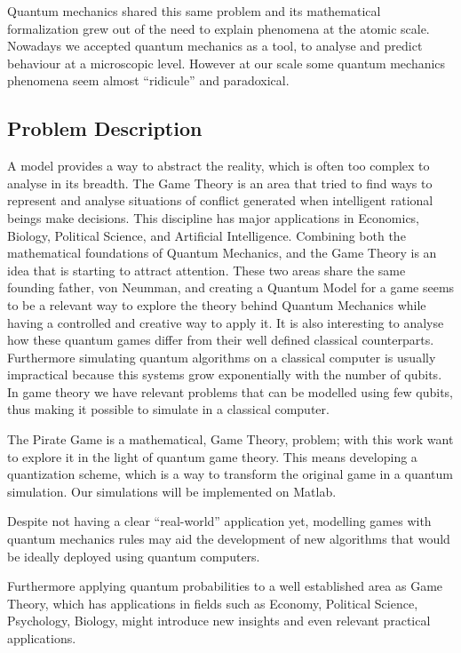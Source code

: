 \documentclass[10pt,twocolumn]{llncs}
\begin{document}
Quantum mechanics shared this same problem and its mathematical formalization grew out of the need to explain phenomena at the atomic scale\cite{Mehra1982}. Nowadays we  accepted quantum mechanics as a tool, to analyse and predict behaviour at a microscopic level. However at our scale some quantum mechanics phenomena seem almost ``ridicule'' and paradoxical.
\subsection{Problem Description}
\label{sec:int_problem}

A model provides a way to abstract the reality, which is often too complex to analyse in its breadth. The Game Theory is an area that tried to find ways to represent and analyse situations of conflict generated when intelligent rational beings make decisions. This discipline has major applications in Economics, Biology, Political Science, and Artificial Intelligence. 
Combining both the mathematical foundations of Quantum Mechanics, and the Game Theory is an idea that is starting to attract attention. These two areas share the same founding father, von Neumman, and creating a Quantum Model for a game seems to be a relevant way to explore the theory behind Quantum Mechanics while having a controlled and creative way to apply it. It is also interesting to analyse how these quantum games differ from their well defined classical counterparts. Furthermore  simulating quantum algorithms on a classical computer is usually impractical because this systems grow exponentially with the number of qubits. In game theory we have relevant problems that can be modelled using few qubits, thus making it possible to simulate in a classical computer.

The Pirate Game is a mathematical, Game Theory, problem; with this work want to explore it in the light of quantum game theory. This means developing a quantization scheme, which is a way to transform the original game in a quantum simulation. Our simulations will be implemented on Matlab.

Despite not having a clear ``real-world'' application yet, modelling games with quantum mechanics rules may aid the development of new algorithms that would be ideally deployed using quantum computers. 

Furthermore applying quantum probabilities to a well established area as Game Theory, which has applications in fields such as Economy, Political Science, Psychology, Biology, might introduce new insights and even relevant practical applications\cite{Eisert2008}. 
\end{document}
